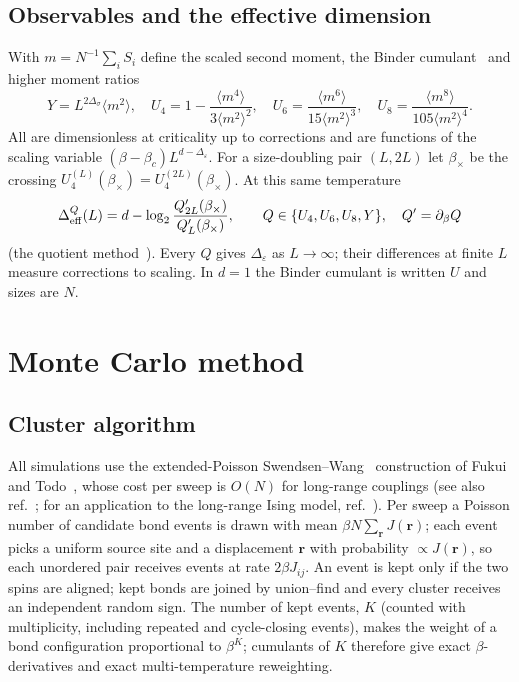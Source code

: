 \documentclass[10pt,a4paper]{article}
\newcommand{\Ds}{\Delta_\sigma}
\newcommand{\De}{\Delta_\varepsilon}
\newcommand{\Deff}{\Delta_{\rm eff}}
\begin{document}
\subsection{Observables and the effective dimension}
With $m=N^{-1}\sum_iS_i$ define the scaled second moment, the Binder cumulant~\cite{Binder:1981sa} and higher moment ratios
\begin{equation}
 Y=L^{2\Ds}\langle m^2\rangle,\quad U_4=1-\frac{\langle m^4\rangle}{3\langle m^2\rangle^2},\quad
 U_6=\frac{\langle m^6\rangle}{15\langle m^2\rangle^3},\quad U_8=\frac{\langle m^8\rangle}{105\langle m^2\rangle^4}.
\end{equation}
All are dimensionless at criticality up to corrections and are functions of the scaling variable $(\beta-\beta_c)L^{d-\De}$. For a
size-doubling pair $(L,2L)$ let $\beta_\times$ be the crossing $U_4^{(L)}(\beta_\times)=U_4^{(2L)}(\beta_\times)$. At this same temperature
\begin{equation}
 \Deff^{Q}(L)=d-\log_2\frac{Q'_{2L}(\beta_\times)}{Q'_L(\beta_\times)},\qquad Q\in\{U_4,U_6,U_8,Y\},\quad Q'=\partial_\beta Q
 \label{eq:Deff}
\end{equation}
(the quotient method~\cite{Ballesteros:1996bd}). Every $Q$ gives $\De$ as $L\to\infty$; their differences at finite $L$ measure corrections to
scaling. In $d=1$ the Binder cumulant is written $U$ and sizes are $N$.

\section{Monte Carlo method}\label{sec:mc}
\subsection{Cluster algorithm}
All simulations use the extended-Poisson Swendsen--Wang~\cite{Swendsen:1987ce} construction of Fukui and Todo~\cite{Fukui:2009on}, whose cost
per sweep is $O(N)$ for long-range couplings (see also ref.~\cite{Luijten:1995mc}; for an application to the long-range Ising model,
ref.~\cite{Horita:2017ul}). Per sweep a Poisson number of candidate bond events is
drawn with mean $\beta N\sum_{\mathbf r}J(\mathbf r)$; each event picks a uniform source site and a displacement $\mathbf r$ with probability
$\propto J(\mathbf r)$, so each unordered pair receives events at rate $2\beta J_{ij}$. An event is kept only if the two spins are aligned;
kept bonds are joined by union--find and every cluster receives an independent random sign. The number of kept events, $K$ (counted with
multiplicity, including repeated and cycle-closing events), makes the weight of a bond configuration proportional to $\beta^K$; cumulants of
$K$ therefore give exact $\beta$-derivatives and exact multi-temperature reweighting.
\end{document}
